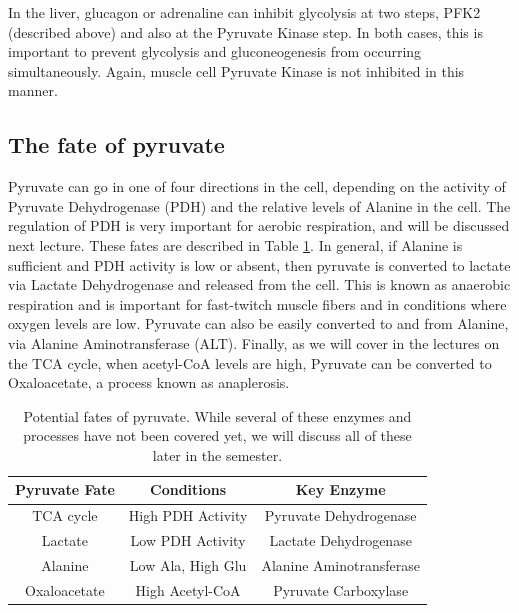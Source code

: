 \documentclass{tufte-handout}
\begin{document}
  In the liver, glucagon or adrenaline can inhibit glycolysis at two steps, PFK2 (described above) and also at the Pyruvate Kinase step.  In both cases, this is important to prevent glycolysis and gluconeogenesis from occurring simultaneously.  Again, muscle cell Pyruvate Kinase is not inhibited in this manner.

\subsection{The fate of pyruvate}

Pyruvate can go in one of four directions in the cell, depending on the activity of Pyruvate Dehydrogenase (PDH) and the relative levels of Alanine in the cell.  The regulation of PDH is very important for aerobic respiration, and will be discussed next lecture.  These fates are described in Table \ref{tab:pyruvate-fates}.  In general, if Alanine is sufficient and PDH activity is low or absent, then pyruvate is converted to lactate via Lactate Dehydrogenase and released from the cell.  This is known as anaerobic respiration and is important for fast-twitch muscle fibers and in conditions where oxygen levels are low.  Pyruvate can also be easily converted to and from Alanine, via Alanine Aminotransferase (ALT).  Finally, as we will cover in the lectures on the TCA cycle, when acetyl-CoA levels are high, Pyruvate can be converted to Oxaloacetate, a process known as anaplerosis.
\\[0.6cm]

\begin{table}
\centering
\caption{Potential fates of pyruvate.  While several of these enzymes and processes have not been covered yet, we will discuss all of these later in the semester.}
\label{tab:pyruvate-fates}
\begin{tabular}{ccc}
\hline
\textbf {Pyruvate Fate} & \textbf{Conditions}  & \textbf{Key Enzyme} \\
\hline
TCA cycle & High PDH Activity & Pyruvate Dehydrogenase \\
Lactate & Low PDH Activity & Lactate Dehydrogenase \\
Alanine & Low Ala, High Glu & Alanine Aminotransferase\\
Oxaloacetate & High Acetyl-CoA & Pyruvate Carboxylase \\
\hline
\end{tabular}
\end{table}
\end{document}
